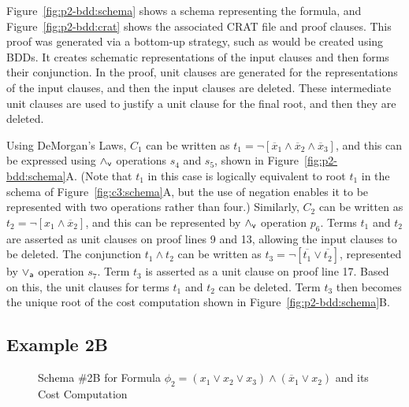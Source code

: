 \documentclass{llncs}
\newcommand{\pand}{\mathbin{\land_{\sf v}}}
\newcommand{\por}{\mathbin{\lor_{\sf a}}}
\newcommand{\obar}[1]{\overline{#1}}
\begin{document}
Figure~\ref{fig:p2-bdd:schema} shows a schema representing the formula,
and Figure~\ref{fig:p2-bdd:crat} shows the associated CRAT file and proof clauses.  This
proof was generated via a bottom-up strategy, such as would be created
using BDDs.  It creates schematic representations of the input
clauses and then forms their conjunction.  In the proof, unit
clauses are generated for the representations of the input clauses,
and then the input clauses are deleted.  These intermediate unit
clauses are used to justify a unit clause for the final root, and then
they are deleted.

Using DeMorgan's Laws, $C_1$ can be written as 
$t_1 = \neg [\obar{x}_1\land \obar{x}_2\land \obar{x}_3]$, and this can be
expressed using $\pand$ operations $s_4$ and $s_5$, shown in
Figure~\ref{fig:p2-bdd:schema}A\@.  (Note that $t_1$ in this case is
logically equivalent to root $t_1$ in the schema of
Figure~\ref{fig:c3:schema}A, but the use of negation enables it to be
represented with two operations rather than four.)  Similarly, $C_2$
can be written as $t_2 = \neg [x_1\land \obar{x}_2]$, and this can be
represented by $\pand$ operation $p_6$.
Terms $t_1$ and $t_2$ are asserted as unit clauses on proof lines 9 and 13,
allowing the input clauses to be deleted.
The conjunction $t_1 \land t_2$
can be written as $t_3 = \neg[\obar{t_1} \lor \obar{t_2}]$, represented by $\por$ operation $s_7$.
Term $t_3$ is asserted as a unit clause on proof line 17.
Based on this, the unit clauses for terms $t_1$ and
$t_2$ can be deleted.  Term $t_3$ then becomes the unique root of the cost
computation shown in Figure~\ref{fig:p2-bdd:schema}B\@.

\subsection{Example 2B}

\begin{figure}
\caption{Schema \#2B for Formula $\phi_2 = (x_1 \lor x_2 \lor x_3) \land (\obar{x}_1 \lor x_2)$ and its Cost Computation}
\label{fig:p2-cdcl:schema}
\end{figure}
\end{document}
